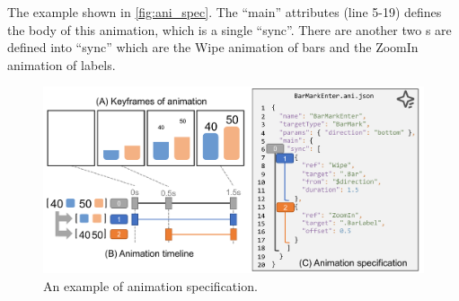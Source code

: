 The example shown in \autoref{fig:ani_spec}. The ``main'' attributes (line 5-19) defines the body of this animation, which is a single \aniunit{} ``sync''. There are another two \aniunit{}s are defined into ``sync'' which are the Wipe animation of bars and the ZoomIn animation of labels.
%

%
\begin{figure}[h]
  \includegraphics[width=\linewidth]{figs/ani_spec_ex_in_method.pdf}
  \caption{
  An example of \gaia{} animation specification. }																																																																																																																																																																																																																																																																																														
  \label{fig:ani_spec}
\end{figure}

